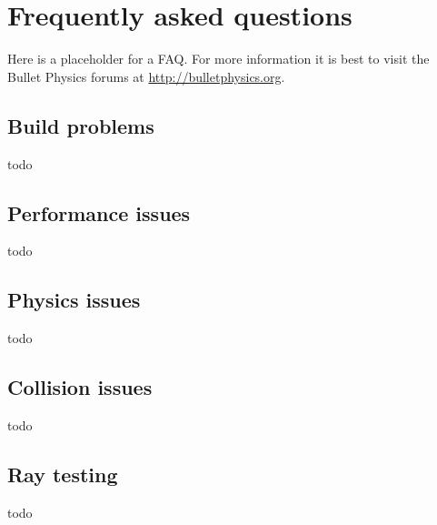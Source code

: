 
\chapter{Frequently asked questions}
Here is a placeholder for a FAQ. For more information it is best to visit the Bullet Physics forums at \url{http://bulletphysics.org}.
\section{Build problems}
todo
\section{Performance issues}
todo
\section{Physics issues}
todo
\section{Collision issues}
todo
\section{Ray testing}
todo
